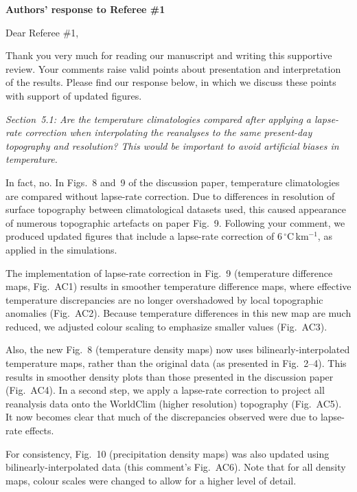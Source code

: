 \documentclass[10pt]{article}
\begin{document}
\textbf{Authors' response to Referee {\#}1}
\bigskip


\renewcommand\thefigure{AC\arabic{figure}}
\def\referee#1{\bigskip\textcolor{journalname}{\textit{#1}}}

Dear Referee {\#}1,

Thank you very much for reading our manuscript and writing this supportive review. Your comments raise valid points about presentation and interpretation of the results. Please find our response below, in which we discuss these points with support of updated figures.

\referee{Section~5.1: Are the temperature climatologies compared after applying a lapse-rate correction when interpolating the reanalyses to the same present-day topography and resolution? This would be important to avoid artificial biases in temperature.}

In fact, no. In Figs.~8 and~9 of the discussion paper, temperature climatologies are compared without lapse-rate correction. Due to differences in resolution of surface topography between climatological datasets used, this caused appearance of numerous topographic artefacts on paper Fig.~9. Following your comment, we produced updated figures that include a lapse-rate correction of 6\,{$^\circ$}C\,km$^{-1}$, as applied in the simulations.

The implementation of lapse-rate correction in Fig.~9 (temperature difference maps, Fig.~AC1)  results in smoother temperature difference maps, where effective temperature discrepancies are no longer overshadowed by local topographic anomalies (Fig.~AC2). Because temperature differences in this new map are much reduced, we adjusted colour scaling to emphasize smaller values (Fig.~AC3).

Also, the new Fig.~8 (temperature density maps) now uses bilinearly-interpolated temperature maps, rather than the original data (as presented in Fig.~2--4). This results in smoother density plots than those presented in the discussion paper (Fig.~AC4). In a second step, we apply a lapse-rate correction to project all reanalysis data onto the WorldClim (higher resolution) topography (Fig.~AC5). It now becomes clear that much of the discrepancies observed were due to lapse-rate effects.

For consistency, Fig.~10 (precipitation density maps) was also updated using bilinearly-interpolated data (this comment's Fig.~AC6). Note that for all density maps, colour scales were changed to allow for a higher level of detail.
\end{document}

